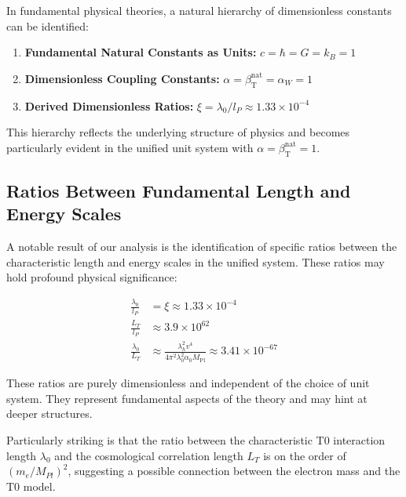 \documentclass[12pt,a4paper]{article}
\newcommand{\betaT}{\beta_{\text{T}}}
\newcommand{\Mpl}{M_{\text{Pl}}}
\begin{document}
	In fundamental physical theories, a natural hierarchy of dimensionless constants can be identified:
	
	\begin{enumerate}[label=\arabic*.]
		\item \textbf{Fundamental Natural Constants as Units:} \(c = \hbar = G = k_B = 1\)
		\item \textbf{Dimensionless Coupling Constants:} \(\alpha = \betaT^{\text{nat}} = \alpha_W = 1\)
		\item \textbf{Derived Dimensionless Ratios:} \(\xi = \lambda_0/l_P \approx 1.33 \times 10^{-4}\)
	\end{enumerate}
	
	This hierarchy reflects the underlying structure of physics and becomes particularly evident in the unified unit system with \(\alpha = \betaT^{\text{nat}} = 1\).
	
	\subsection{Ratios Between Fundamental Length and Energy Scales}
	
	A notable result of our analysis is the identification of specific ratios between the characteristic length and energy scales in the unified system. These ratios may hold profound physical significance:
	
	\begin{tcolorbox}[colback=blue!5!white,colframe=blue!75!black,title=Fundamental Ratios in the Unified Unit System]
		\begin{align}
			\frac{\lambda_0}{l_P} &= \xi \approx 1.33 \times 10^{-4} \\
			\frac{L_T}{l_P} &\approx 3.9 \times 10^{62} \\
			\frac{\lambda_0}{L_T} &\approx \frac{\lambda_h^2 v^4}{4\pi^2 \lambda_0^2 \alpha_0 \Mpl} \approx 3.41 \times 10^{-67}
		\end{align}
	\end{tcolorbox}
	
	These ratios are purely dimensionless and independent of the choice of unit system. They represent fundamental aspects of the theory and may hint at deeper structures.
	
	Particularly striking is that the ratio between the characteristic T0 interaction length \(\lambda_0\) and the cosmological correlation length \(L_T\) is on the order of \((m_e/M_{Pl})^2\), suggesting a possible connection between the electron mass and the T0 model.
	
\end{document}
